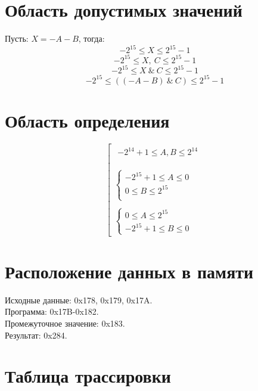 \documentclass{article}
\begin{document}
\section{Область допустимых значений}
Пусть: $ X = -A -B $, тогда:
$$ -2^{15} \le X \le 2^{15} - 1 $$
$$ -2^{15} \le X,\ C \le 2^{15} - 1 $$
$$ -2^{15} \le X\ \&\ C \le 2^{15} - 1 $$
$$ -2^{15} \le ((-A -B)\ \&\ C) \le 2^{15} - 1 $$




\section{Область определения}
$$
  \left[{ \begin{array}{l}
        \begin{array}{l} -2^{14}+1 \le A,B \le 2^{14} \\
        \end{array}                \\
        \\
        \left\{ \begin{array}{l}
          -2^{15}+1 \le A   \le 0 \\
          0 \le B   \le 2^{15}    \\
        \end{array}\right. \\
        \\
        \left\{ \begin{array}{l}
          0 \le A   \le 2^{15} \\
          -2^{15}+1 \le B   \le 0
        \end{array}\right.
      \end{array}}\right.
$$

\section{Расположение данных в памяти}
Исходные данные: 0x178, 0x179, 0x17A. \\
Программа: 0x17B-0x182. \\
Промежуточное значение: 0x183. \\
Результат: 0x284. \\

\section{Таблица трассировки}
\end{document}
